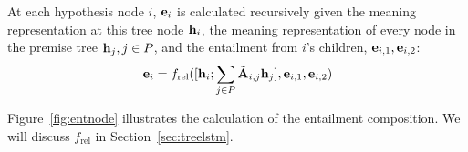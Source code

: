At each hypothesis node $i$, $\mathbf{e}_i$ is calculated recursively given
the meaning representation at this tree node $\mathbf{h}_i$,
the meaning representation of every node in the premise tree $\mathbf{h}_j, j\in P$,
and the entailment from $i$'s children, $\mathbf{e}_{i, 1}, \mathbf{e}_{i, 2}$:
\begin{equation}
\mathbf{e}_i 
= f_{\text{rel}}([\mathbf{h}_i; \sum_{j\in P}\tilde{\mathbf{A}}_{i,j} \mathbf{h}_j], \mathbf{e}_{i, 1}, \mathbf{e}_{i, 2})
\label{eq:relcomp}
\end{equation}

Figure~\ref{fig:entnode} illustrates the calculation
of the entailment composition.
We will discuss $f_{\text{rel}}$ in Section~\ref{sec:treelstm}.


